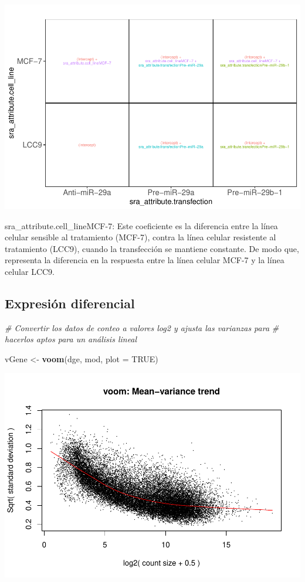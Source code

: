 \documentclass[
]{article}
\newenvironment{Shaded}{\begin{snugshade}}{\end{snugshade}}
\newcommand{\AttributeTok}[1]{\textcolor[rgb]{0.13,0.29,0.53}{#1}}
\newcommand{\CommentTok}[1]{\textcolor[rgb]{0.56,0.35,0.01}{\textit{#1}}}
\newcommand{\ConstantTok}[1]{\textcolor[rgb]{0.56,0.35,0.01}{#1}}
\newcommand{\FunctionTok}[1]{\textcolor[rgb]{0.13,0.29,0.53}{\textbf{#1}}}
\newcommand{\NormalTok}[1]{#1}
\newcommand{\OtherTok}[1]{\textcolor[rgb]{0.56,0.35,0.01}{#1}}
\begin{document}
\includegraphics{Proyecto_RNAseq_files/figure-latex/unnamed-chunk-11-1.pdf}

sra\_attribute.cell\_lineMCF-7: Este coeficiente es la diferencia entre
la línea celular sensible al tratamiento (MCF-7), contra la línea
celular resistente al tratamiento (LCC9), cuando la transfección se
mantiene constante. De modo que, representa la diferencia en la
respuesta entre la línea celular MCF-7 y la línea celular LCC9.

\subsection{Expresión diferencial}\label{expresiuxf3n-diferencial}

\begin{Shaded}
\begin{Highlighting}[]
\CommentTok{\# Convertir los datos de conteo a valores log2 y ajusta las varianzas para }
\CommentTok{\# hacerlos aptos para un análisis lineal }

\NormalTok{vGene }\OtherTok{\textless{}{-}} \FunctionTok{voom}\NormalTok{(dge, mod, }\AttributeTok{plot =} \ConstantTok{TRUE}\NormalTok{)}
\end{Highlighting}
\end{Shaded}

\includegraphics{Proyecto_RNAseq_files/figure-latex/unnamed-chunk-12-1.pdf}
\end{document}
